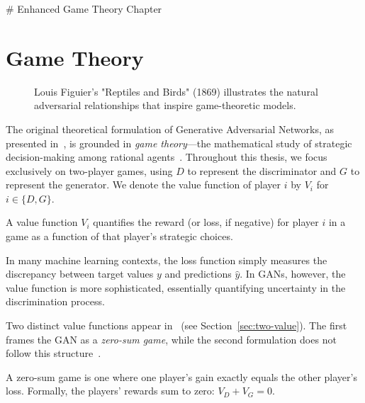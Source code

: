 # Enhanced Game Theory Chapter

\section{Game Theory}%
\label{sec:game-theory}
\vspace{1cm}
\begin{figure}[h]%
	\label{fig:paradise}
	\centering
	\caption{Louis Figuier's "Reptiles and Birds" (1869) illustrates the natural adversarial relationships that inspire game-theoretic models.}
\end{figure}
\vspace{1cm}
\noindent The original theoretical formulation of Generative Adversarial Networks, as presented in~\cite{ref:goodfellow-original}, is grounded in \textit{game theory}—the mathematical study of strategic decision-making among rational agents~\cite{ref:myerson}. Throughout this thesis, we focus exclusively on two-player games, using $D$ to represent the discriminator and $G$ to represent the generator. We denote the value function of player $i$ by $V_i$ for $i \in \{D, G\}$.

\begin{definition}%
	\label{def:value-function}
	A \textnormal{\sffamily value function} $V_i$ quantifies the reward (or loss, if negative) for player $i$ in a game as a function of that player's strategic choices.
\end{definition}

\begin{remark}
	In many machine learning contexts, the loss function simply measures the discrepancy between target values $y$ and predictions $\hat{y}$. In GANs, however, the value function is more sophisticated, essentially quantifying uncertainty in the discrimination process.
\end{remark}

Two distinct value functions appear in~\cite{ref:goodfellow-original} (see Section~\ref{sec:two-value}). The first frames the GAN as a \textit{zero-sum game}, while the second formulation does not follow this structure~\cite{ref:gidel-variational-2018}.

\begin{definition}%
	\label{def:zero-sum-game}
	A \textnormal{\sffamily zero-sum game} is one where one player's gain exactly equals the other player's loss. Formally, the players' rewards sum to zero: $V_D + V_G = 0$.
\end{definition}

